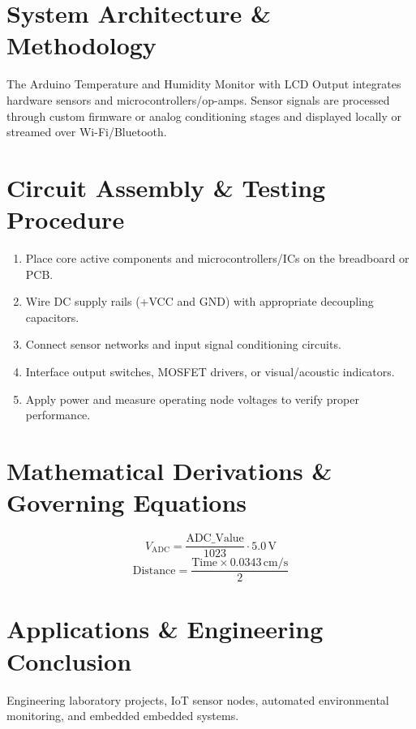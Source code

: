 \documentclass[11pt,a4paper]{article}
\begin{document}
\section{System Architecture \& Methodology}
The Arduino Temperature and Humidity Monitor with LCD Output integrates hardware sensors and microcontrollers/op-amps. Sensor signals are processed through custom firmware or analog conditioning stages and displayed locally or streamed over Wi-Fi/Bluetooth.

\section{Circuit Assembly \& Testing Procedure}
\begin{enumerate}
    \item Place core active components and microcontrollers/ICs on the breadboard or PCB.
    \item Wire DC supply rails (+VCC and GND) with appropriate decoupling capacitors.
    \item Connect sensor networks and input signal conditioning circuits.
    \item Interface output switches, MOSFET drivers, or visual/acoustic indicators.
    \item Apply power and measure operating node voltages to verify proper performance.
\end{enumerate}

\section{Mathematical Derivations \& Governing Equations}
\begin{equation}
V_{\text{ADC}} = \frac{\text{ADC\_Value}}{1023} \cdot 5.0\,\text{V}
\end{equation}
\begin{equation}
\text{Distance} = \frac{\text{Time} \times 0.0343\,\text{cm/s}}{2}
\end{equation}

\section{Applications \& Engineering Conclusion}
Engineering laboratory projects, IoT sensor nodes, automated environmental monitoring, and embedded embedded systems.
\end{document}
